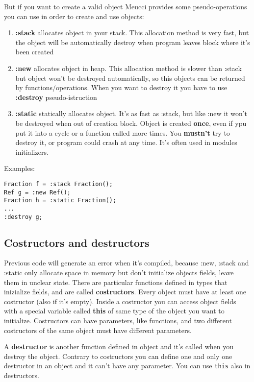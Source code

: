 \documentclass[10pt]{book}%
\newcommand{\code}[1]{\texttt{#1}}
\renewcommand{\emph}[1]{\textbf{#1}}
\newenvironment{codeenv}{
\begin{mdframed}[backgroundcolor=black!20,topline=false,leftline=false,rightline=false,bottomline=false]
}
{\end{mdframed}}
\begin{document}
But if you want to create a valid object Meucci provides some pseudo-operations you can use  in order to create and use objects:
\begin{enumerate}
\item \emph{:stack} allocates object in your stack. This allocation method is very fast, but the object will be automatically destroy when program leaves block where it's been created
\item \emph{:new} allocates object in heap. This allocation method is slower than :stack but object won't be destroyed automatically, so this objects can be returned by functions/operations. When you want to destroy it you have to use \emph{:destroy} pseudo-istruction
\item \emph{:static} statically allocates object. It's as fast as :stack, but like :new it won't be destroyed when out of creation block. Object is created \emph{once}, even if ypu put it into a cycle or a function called more times. You \emph{mustn't} try to destroy it, or program could crash at any time. It's often used in modules initializers.
\end{enumerate}
Examples:
\begin{codeenv}
\begin{verbatim}
Fraction f = :stack Fraction();
Ref g = :new Ref();
Fraction h = :static Fraction();
...
:destroy g;
\end{verbatim}
\end{codeenv}

\subsection{Costructors and destructors}
Previous code will generate an error when it's compiled, because :new, :stack and :static only allocate space in memory but don't initialize objects fields, leave them in unclear state. There are particular functions defined in types that inizialize fields, and are called \emph{costructors}. Every object must have at least one costructor (also if it's empty). Inside a costructor you can access object fields with a special variable called \emph{this} of same type of the object you want to initialize. Costructors can have parameters, like functions, and two different costructors of the same object must have different parameters.

A \emph{destructor} is another function defined in object and it's called when you destroy the object. Contrary to costructors you can define one and only one destructor in an object and it can't have any parameter. You can use \code{this} also in destructors.
\end{document}

